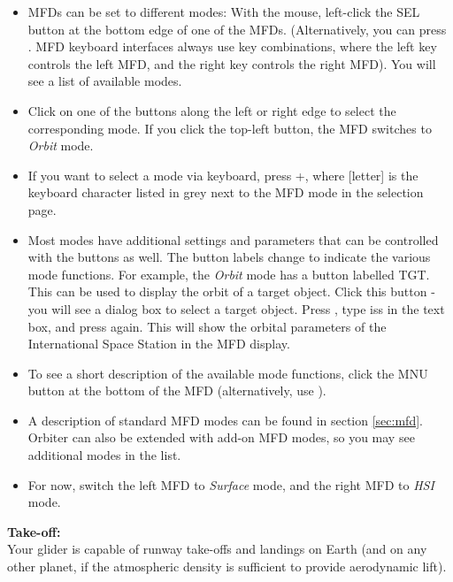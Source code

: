 \documentclass[Orbiter User Manual.tex]{subfiles}
\begin{document}
\begin{itemize}
\item MFDs can be set to different modes: With the mouse, left-click the SEL button at the bottom edge of one of the MFDs. (Alternatively, you can press \Shift{}. MFD keyboard interfaces always use \Shift key combinations, where the left \Shift key controls the left MFD, and the right \Shift key controls the right MFD). You will see a list of available modes.
\item Click on one of the buttons along the left or right edge to select the corresponding mode. If you click the top-left button, the MFD switches to \textit{Orbit} mode.
\item If you want to select a mode via keyboard, press \Shift{}+\Shift[letter], where [letter] is the keyboard character listed in grey next to the MFD mode in the selection page.
\item Most modes have additional settings and parameters that can be controlled with the buttons as well. The button labels change to indicate the various mode functions. For example, the \textit{Orbit} mode has a button labelled TGT. This can be used to display the orbit of a target object. Click this button - you will see a dialog box to select a target object. Press \Enter, type iss in the text box, and press \Enter again. This will show the orbital parameters of the International Space Station in the MFD display.
\item To see a short description of the available mode functions, click the MNU button at the bottom of the MFD (alternatively, use \Shift{}).
\item A description of standard MFD modes can be found in section \ref{sec:mfd}. Orbiter can also be extended with add-on MFD modes, so you may see additional modes in the list.
\item For now, switch the left MFD to \textit{Surface} mode, and the right MFD to \textit{HSI} mode.
\end{itemize}

\noindent
\begin{figure}[H]
	\centering
\end{figure}

\noindent
\textbf{Take-off:}\\
Your glider is capable of runway take-offs and landings on Earth (and on any other planet, if the atmospheric density is sufficient to provide aerodynamic lift).
\end{document}
